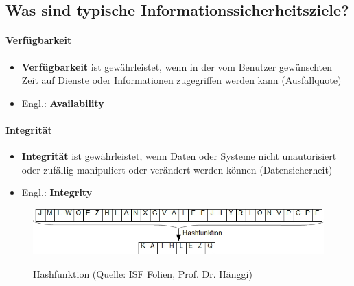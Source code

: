 \subsection*{Was sind typische Informationssicherheitsziele?}\label{sub:Informationssicherheitsziele}
\paragraph*{Verfügbarkeit}\label{par:Availability}
\begin{itemize}
    \item \textbf{Verfügbarkeit} ist gewährleistet, wenn in der vom Benutzer gewünschten Zeit auf Dienste oder Informationen zugegriffen werden kann (Ausfallquote)
    \item Engl.: \textbf{Availability}
\end{itemize}

\paragraph*{Integrität}\label{par:Integrity}
\begin{itemize}
    \item \textbf{Integrität} ist gewährleistet, wenn Daten oder Systeme nicht unautorisiert oder zufällig manipuliert oder verändert werden können (Datensicherheit)
    \item Engl.: \textbf{Integrity}
\end{itemize}
\begin{figure}[H]
    \begin{center}
    \label{pic:Hash}
    \includegraphics[width=\textwidth]{images/hash.png}
    \caption{Hashfunktion (Quelle: ISF Folien, Prof. Dr. Hänggi)}
    \end{center}
\end{figure}

